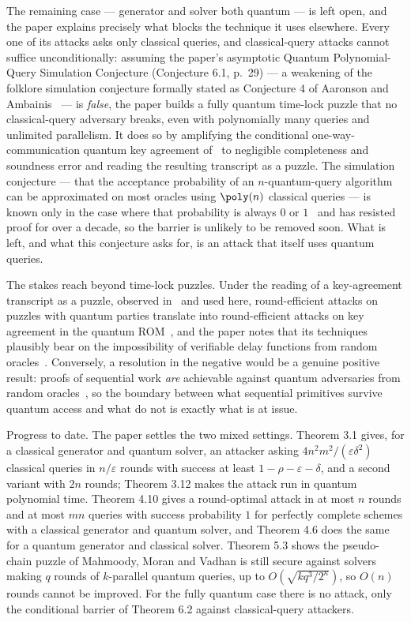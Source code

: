 \documentclass{conjura-conjecture}
\begin{document}
The remaining case --- generator and solver both quantum --- is left open,
and the paper explains precisely what blocks the technique it uses
elsewhere. Every one of its attacks asks only classical queries, and
classical-query attacks cannot suffice unconditionally: assuming the
paper's asymptotic Quantum Polynomial-Query Simulation Conjecture
(Conjecture 6.1, p.~29) --- a weakening of the folklore simulation
conjecture formally stated as Conjecture 4 of Aaronson and
Ambainis~\cite{AA14} --- is \emph{false}, the paper builds a fully quantum
time-lock puzzle that no classical-query adversary breaks, even with
polynomially many queries and unlimited parallelism. It does so by
amplifying the conditional one-way-communication quantum key agreement
of~\cite{ACC22} to negligible completeness and soundness error and reading
the resulting transcript as a puzzle. The simulation conjecture --- that
the acceptance probability of an $n$-quantum-query algorithm can be
approximated on most oracles using $\poly(n)$ classical queries --- is
known only in the case where that probability is always $0$ or
$1$~\cite{OSSS05} and has resisted proof for over a decade, so the barrier
is unlikely to be removed soon. What is left, and what this conjecture asks
for, is an attack that itself uses quantum queries.

The stakes reach beyond time-lock puzzles. Under the reading of a
key-agreement transcript as a puzzle, observed in~\cite{MMV11} and used
here, round-efficient attacks on puzzles with quantum parties translate
into round-efficient attacks on key agreement in the quantum
ROM~\cite{ACC22}, and the paper notes that its techniques plausibly bear on
the impossibility of verifiable delay functions from random
oracles~\cite{MSW20}. Conversely, a resolution in the negative would be a
genuine positive result: proofs of sequential work \emph{are} achievable
against quantum adversaries from random oracles~\cite{CFHL21}, so the
boundary between what sequential primitives survive quantum access and what
do not is exactly what is at issue.

Progress to date. The paper settles the two mixed settings. Theorem 3.1
gives, for a classical generator and quantum solver, an attacker asking
$4n^{2}m^{2}/(\varepsilon\delta^{2})$ classical queries in $n/\varepsilon$
rounds with success at least $1 - \rho - \varepsilon - \delta$, and a second
variant with $2n$ rounds; Theorem 3.12 makes the attack run in quantum
polynomial time. Theorem 4.10 gives a round-optimal attack in at most $n$
rounds and at most $mn$ queries with success probability $1$ for perfectly
complete schemes with a classical generator and quantum solver, and Theorem
4.6 does the same for a quantum generator and classical solver. Theorem 5.3
shows the pseudo-chain puzzle of Mahmoody, Moran and Vadhan is still secure
against solvers making $q$ rounds of $k$-parallel quantum queries, up to
$O(\sqrt{kq^{3}/2^{\kappa}})$, so $O(n)$ rounds cannot be improved. For the
fully quantum case there is no attack, only the conditional barrier of
Theorem 6.2 against classical-query attackers.
\end{document}
